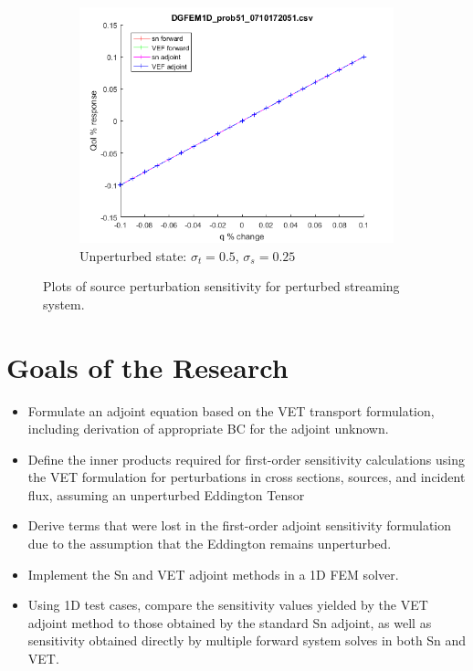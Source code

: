 \documentclass{article}
\newcommand{\sigt}{\sigma_t}
\newcommand{\sigs}{\sigma_s}
\begin{document}
\begin{figure}[H]
\begin{subfigure}{.65\textwidth}
  \centering
  \includegraphics[width=.98\linewidth]{figures/51qSens.png}
  \caption{Unperturbed state: $\sigt=0.5$, $\sigs=0.25$}
  \label{fig:sfig3}
\end{subfigure}
\caption{Plots of source perturbation sensitivity for perturbed streaming system.}
\label{fig:fig}
\end{figure}


\section{Goals of the Research}

\begin{itemize}
\item Formulate an adjoint equation based on the VET transport formulation, including derivation of appropriate BC for the adjoint unknown.
\item Define the inner products required for first-order sensitivity calculations using the VET formulation for perturbations in cross sections, sources, and incident flux, assuming an unperturbed Eddington Tensor
\item Derive terms that were lost in the first-order adjoint sensitivity formulation due to the assumption that the Eddington remains unperturbed. 
\item Implement the Sn and VET adjoint methods in a 1D FEM solver. 
\item Using 1D test cases, compare the sensitivity values yielded by the VET adjoint method to those obtained by the standard Sn adjoint, as well as sensitivity obtained directly by multiple forward system solves in both Sn and VET.
\end{itemize}
\end{document}
